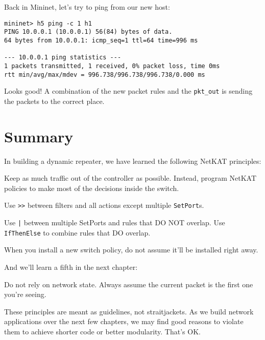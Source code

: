Back in Mininet, let's try to ping from our new host:

\begin{verbatim}
mininet> h5 ping -c 1 h1
PING 10.0.0.1 (10.0.0.1) 56(84) bytes of data.
64 bytes from 10.0.0.1: icmp_seq=1 ttl=64 time=996 ms

--- 10.0.0.1 ping statistics ---
1 packets transmitted, 1 received, 0% packet loss, time 0ms
rtt min/avg/max/mdev = 996.738/996.738/996.738/0.000 ms
\end{verbatim}

Looks good!  A combination of the new packet rules and the \texttt{pkt\_out} 
is sending the packets to the correct place.  

\section{Summary}

In building a dynamic repeater, we have learned the following NetKAT principles:

\setcounter{principle}{0}

\begin{principle}
Keep as much traffic out of the controller as possible.
Instead, program NetKAT policies to make most of the decisions inside the switch.  
\end{principle}

\begin{principle}
Use \texttt{>>} between filters and all actions except multiple \texttt{SetPort}s.
\end{principle}

\begin{principle}
Use \texttt{|} between multiple SetPorts and rules that DO NOT overlap.
Use \texttt{IfThenElse} to combine rules that DO overlap. 
\end{principle}

\begin{principle}
When you install a new switch policy, do not assume it'll be installed right away.  
\end{principle}

And we'll learn a fifth in the next chapter:

\begin{principle}
Do not rely on network state.  Always assume the current packet is the first one you're seeing.   
\end{principle}

These principles are meant as guidelines, not straitjackets.
As we build network applications over the next few chapters, we may find good reasons to violate them 
to achieve shorter code or better modularity.
That's OK. 

